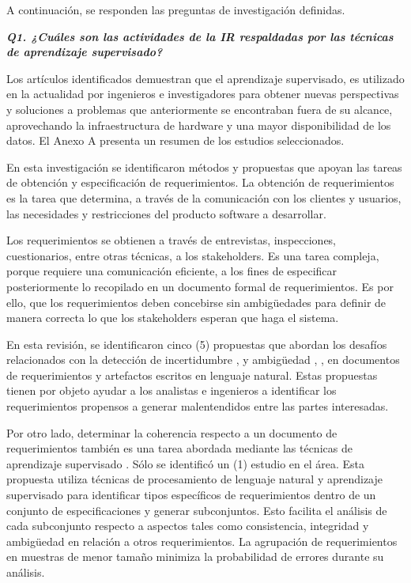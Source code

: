 \documentclass[journal]{IEEEtran}
\begin{document}
A continuación, se responden las preguntas de investigación definidas.

\emph{\textbf{Q1. ¿Cuáles son las actividades de la IR respaldadas por las técnicas de aprendizaje supervisado?}}

Los artículos identificados demuestran que el aprendizaje supervisado, es utilizado en la actualidad por ingenieros e investigadores para obtener nuevas perspectivas y soluciones a problemas que anteriormente se encontraban fuera de su alcance, aprovechando la infraestructura de hardware y una mayor disponibilidad de los datos. El Anexo A presenta un resumen de los estudios seleccionados.

En esta investigación se identificaron métodos y propuestas que apoyan las tareas de obtención y especificación de requerimientos. La obtención de requerimientos es la tarea que determina, a través de la comunicación con los clientes y usuarios, las necesidades y restricciones del producto software a desarrollar.
 
Los requerimientos se obtienen a través de entrevistas, inspecciones, cuestionarios, entre otras técnicas, a los stakeholders. Es una tarea compleja, porque requiere una comunicación eficiente, a los fines de especificar posteriormente lo recopilado en un documento formal de requerimientos. Es por ello, que los requerimientos deben concebirse sin ambigüedades para definir de manera correcta lo que los stakeholders esperan que haga el sistema.

En esta revisión, se identificaron cinco (5) propuestas que abordan los desafíos relacionados con la detección de incertidumbre \cite{yang2012speculative}, \cite{Knauss201685} y ambigüedad \cite{yang2010extending}, \cite{Yang2011}, \cite{Ott2013} en documentos de requerimientos y artefactos escritos en lenguaje natural. Estas propuestas tienen por objeto ayudar a los analistas e ingenieros a identificar los requerimientos propensos a generar malentendidos entre las partes interesadas.


Por otro lado, determinar la coherencia respecto a un documento de requerimientos también es una tarea abordada mediante las técnicas de aprendizaje supervisado \cite{nikora2009automated}. Sólo se identificó un (1) estudio en el área. Esta propuesta utiliza técnicas de procesamiento de lenguaje natural y aprendizaje supervisado para identificar tipos específicos de requerimientos dentro de un conjunto de especificaciones y generar subconjuntos. Esto facilita el análisis de cada subconjunto respecto a aspectos tales como consistencia, integridad y ambigüedad en relación a otros requerimientos. La agrupación de requerimientos en muestras de menor tamaño minimiza la probabilidad de errores durante su análisis.
\end{document}

